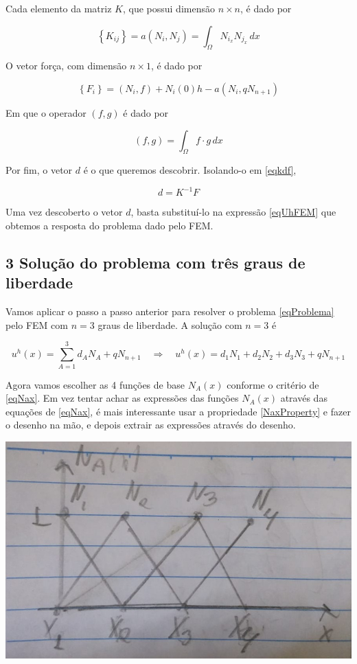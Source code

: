\documentclass[12pt]{scrartcl}
\newcommand{\logo}{\quad \Rightarrow \quad}
\begin{document}
Cada elemento da matriz $K$, que possui dimensão $n \times  n$, é dado por

\[
    \left\{K_{ij}\right\} = a\left(N_i, N_j\right) = \int_{\Omega} N_{i_x} N_{j_x} \, dx
\]

O vetor força, com dimensão $n \times 1$, é dado por

\[
    \left\{F_{i}\right\} = \left(N_i, f\right) + N_i(0)h - a\left(N_i, qN_{n+1}\right)
\]

Em que o operador $\left(f, g\right)$ é dado por

\[
    \left(f, g\right) = \int_{\Omega} f \cdot g \, dx
\]

Por fim, o vetor $d$ é o que queremos descobrir. Isolando-o em \eqref{eqkdf},

\begin{equation}\label{eqdkf}
    d = K^{-1}F
\end{equation}

Uma vez descoberto o vetor $d$, basta substituí-lo na expressão \eqref{eqUhFEM} que obtemos a resposta do problema dado pelo FEM.

\subsection*{3 Solução do problema com três graus de liberdade}

Vamos aplicar o passo a passo anterior para resolver o problema \eqref{eqProblema} pelo FEM com $n = 3$ graus de liberdade.
A solução com $n = 3$ é

\[
    u^h(x) = \sum_{A=1}^3 d_AN_A + qN_{n+1}
    \logo
    u^h(x) = d_1N_1 + d_2N_2 + d_3N_3 + qN_{n+1}
\]

Agora vamos escolher as 4 funções de base $N_A(x)$ conforme o critério de \eqref{eqNax}. Em vez tentar achar as expressões das funções
$N_A(x)$ através das equações de \eqref{eqNax}, é mais interessante usar a propriedade \eqref{NaxProperty} e fazer o desenho na mão,
e depois extrair as expressões através do desenho.

\begin{center}
    \includegraphics[scale=0.5]{AA03_Nax.jpeg}
\end{center}
\end{document}
